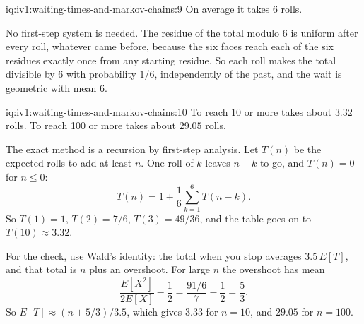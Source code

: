\begin{solution}{iq:iv1:waiting-times-and-markov-chains:9}
On average it takes 6 rolls.

No first-step system is needed. The residue of the total modulo 6 is uniform after every roll, whatever came before, because the six faces reach each of the six residues exactly once from any starting residue. So each roll makes the total divisible by 6 with probability $1/6$, independently of the past, and the wait is geometric with mean 6.

\end{solution}

\enlargethispage{-3\baselineskip}%
\begin{solution}{iq:iv1:waiting-times-and-markov-chains:10}
To reach 10 or more takes about $3.32$ rolls. To reach 100 or more takes about $29.05$ rolls.

The exact method is a recursion by first-step analysis. Let $T(n)$ be the expected rolls to add at least $n$. One roll of $k$ leaves $n - k$ to go, and $T(n) = 0$ for $n \le 0$:
\[
T(n) = 1 + \frac16 \sum_{k=1}^{6} T(n - k).
\]
So $T(1) = 1$, $T(2) = 7/6$, $T(3) = 49/36$, and the table goes on to $T(10) \approx 3.32$.

For the check, use Wald's identity: the total when you stop averages $3.5\,E[T]$, and that total is $n$ plus an overshoot. For large $n$ the overshoot has mean
\[
\frac{E[X^2]}{2E[X]} - \frac12 = \frac{91/6}{7} - \frac12 = \frac53.
\]
So $E[T] \approx (n + 5/3)/3.5$, which gives $3.33$ for $n = 10$, and $29.05$ for $n = 100$.

\end{solution}

